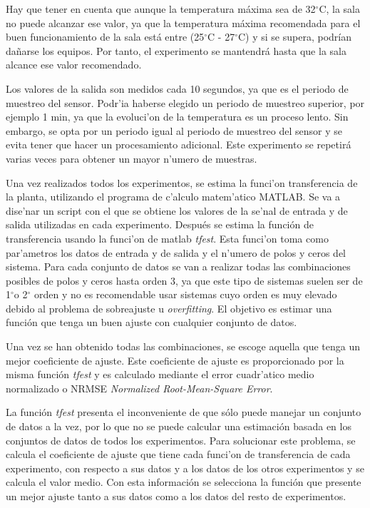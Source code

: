 	Hay que tener en cuenta que aunque la temperatura máxima sea de 32{$^{\circ}$}C, la sala no puede alcanzar ese valor, ya que la temperatura máxima recomendada para el buen funcionamiento de la sala está entre (25{$^{\circ}$}C - 27{$^{\circ}$}C) y si se supera, podrían dañarse los equipos. Por tanto, el experimento se mantendrá hasta que la sala alcance ese valor recomendado. 

	Los valores de la salida son medidos cada 10 segundos, ya que es el periodo de muestreo del sensor. Podr'ia haberse elegido un periodo de muestreo superior, por ejemplo 1 min, ya que la evoluci'on de la temperatura es un proceso lento. Sin embargo, se opta por un periodo igual al periodo de muestreo del sensor y se evita tener que hacer un procesamiento adicional. Este experimento se repetirá varias veces para obtener un mayor n'umero de muestras.

	Una vez realizados todos los experimentos, se estima la funci'on transferencia de la planta, utilizando el programa de c'alculo matem'atico MATLAB. Se va a dise'nar un script con el que se obtiene los valores de la se'nal de entrada y de salida utilizadas en cada experimento. Después se estima la función de transferencia usando la funci'on de matlab \textit{tfest}. Esta funci'on toma como par'ametros los datos de entrada y de salida y el n'umero de polos y ceros del sistema. Para cada conjunto de datos se van a realizar todas las combinaciones posibles de polos y ceros hasta orden 3, ya que este tipo de sistemas suelen ser de 1{$^{\circ}$}o 2{$^{\circ}$} orden y no es recomendable usar sistemas cuyo orden es muy elevado debido al problema de sobreajuste u \textit{overfitting}. El objetivo es estimar una función que tenga un buen ajuste con cualquier conjunto de datos.

	Una vez se han obtenido todas las combinaciones, se escoge aquella que tenga un mejor coeficiente de ajuste. Este coeficiente de ajuste es proporcionado por la misma función \textit{tfest} y es calculado mediante el error cuadr'atico medio normalizado o NRMSE \textit{Normalized Root-Mean-Square Error}. 

	La función \textit{tfest} presenta el inconveniente de que sólo puede manejar un conjunto de datos a la vez, por lo que no se puede calcular una estimación basada en los conjuntos de datos de todos los experimentos. Para solucionar este problema, se calcula el coeficiente de ajuste que tiene cada funci'on de transferencia de cada experimento, con respecto a sus datos y a los datos de los otros experimentos y se calcula el valor medio. Con esta información se selecciona la función que presente un mejor ajuste tanto a sus datos como a los datos del resto de experimentos.

